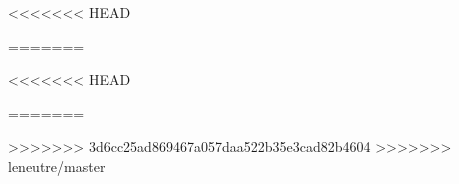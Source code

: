 \documentclass[11pt, a4paper, oneside]{Thesis} %
\begin{document}

\mainmatter %

\pagestyle{fancy} %

<<<<<<< HEAD


 

 
 
 
=======

<<<<<<< HEAD

 

 
 
 
=======
%
 
%
% 
% 
% 
>>>>>>> 3d6cc25ad869467a057daa522b35e3cad82b4604
>>>>>>> leneutre/master




\appendix %







\backmatter


\label{Bibliography}



\end{document}
